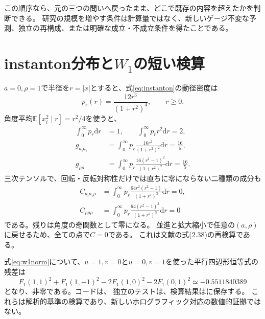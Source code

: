 \documentclass[a4paper,11pt]{ltjsarticle}
\numberwithin{equation}{section}
\newcommand{\dd}{\mathrm d}
\newcommand{\E}{\mathbb E}
\begin{document}
この順序なら、元の三つの問いへ戻ったまま、どこで既存の内容を超えたかを判断できる。
研究の規模を増やす条件は計算量ではなく、新しいゲージ不変な予測、独立の再構成、または明確な成立・不成立条件を得たことである。

\appendix
\section{instanton分布と$W_1$の短い検算}
$a=0,\rho=1$で半径を$r=|x|$とすると、式\eqref{eq:instanton}の動径密度は
\begin{equation}
 p_r(r)=\frac{12r^3}{(1+r^2)^4},\qquad r\geq0.
\end{equation}
角度平均$\E[x_i^2\mid r]=r^2/4$を使うと、
\begin{align}
 \int_0^\infty p_r\dd r&=1,\qquad \int_0^\infty p_r r^2\dd r=2,\\
 g_{a_ia_i}&=\int_0^\infty p_r\frac{16r^2}{(1+r^2)^2}\dd r=\frac{16}{5},\\
 g_{\rho\rho}&=\int_0^\infty p_r\frac{16(r^2-1)^2}{(1+r^2)^2}\dd r=\frac{16}{5}.
\end{align}
三次テンソルで、回転・反転対称性だけでは直ちに零にならない二種類の成分も
\begin{align}
 C_{a_ia_i\rho}&=\int_0^\infty p_r\frac{64r^2(r^2-1)}{(1+r^2)^3}\dd r=0,\\
 C_{\rho\rho\rho}&=\int_0^\infty p_r\frac{64(r^2-1)^3}{(1+r^2)^3}\dd r=0
\end{align}
である。残りは角度の奇関数として零になる。
並進と拡大縮小で任意の$(a,\rho)$に戻せるため、全ての点で$C=0$である。
これは文献\cite{BNT}の式(2.38)の再検算である。

式\eqref{eq:w1norm}について、$u=1,v=0$と$u=0,v=1$を使った平行四辺形恒等式の残差は
\begin{equation}
 F_1(1,1)^2+F_1(1,-1)^2-2F_1(1,0)^2-2F_1(0,1)^2
 \simeq-0.5511840389
\end{equation}
となり、非零である。コードは、
独立のテストは、検算結果はに保存する。
これらは解析的基準の検算であり、新しいホログラフィック対応の数値的証拠ではない。
\end{document}
